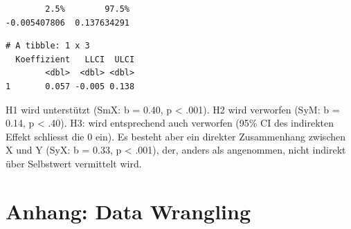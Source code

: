 \documentclass[
  letterpaper,
  DIV=11,
  numbers=noendperiod]{scrreprt}
\newenvironment{Shaded}{\begin{snugshade}}{\end{snugshade}}
\newcommand{\AttributeTok}[1]{\textcolor[rgb]{0.40,0.45,0.13}{#1}}
\newcommand{\CommentTok}[1]{\textcolor[rgb]{0.37,0.37,0.37}{#1}}
\newcommand{\ConstantTok}[1]{\textcolor[rgb]{0.56,0.35,0.01}{#1}}
\newcommand{\DecValTok}[1]{\textcolor[rgb]{0.68,0.00,0.00}{#1}}
\newcommand{\FloatTok}[1]{\textcolor[rgb]{0.68,0.00,0.00}{#1}}
\newcommand{\FunctionTok}[1]{\textcolor[rgb]{0.28,0.35,0.67}{#1}}
\newcommand{\NormalTok}[1]{\textcolor[rgb]{0.00,0.23,0.31}{#1}}
\newcommand{\OtherTok}[1]{\textcolor[rgb]{0.00,0.23,0.31}{#1}}
\newcommand{\SpecialCharTok}[1]{\textcolor[rgb]{0.37,0.37,0.37}{#1}}
\newcommand{\StringTok}[1]{\textcolor[rgb]{0.13,0.47,0.30}{#1}}
\begin{document}
\begin{tcolorbox}
\begin{verbatim}
        2.5%        97.5% 
-0.005407806  0.137634291 
\end{verbatim}

\begin{Shaded}
\end{Shaded}

\begin{verbatim}
# A tibble: 1 x 3
  Koeffizient   LLCI  ULCI
        <dbl>  <dbl> <dbl>
1       0.057 -0.005 0.138
\end{verbatim}

H1 wird unterstützt (SmX: b = 0.40, p \textless{} .001). H2 wird
verworfen (SyM: b = 0.14, p \textless{} .40). H3: wird entsprechend auch
verworfen (95\% CI des indirekten Effekt schliesst die 0 ein). Es
besteht aber ein direkter Zusammenhang zwischen X und Y (SyX: b = 0.33,
p \textless{} .001), der, anders als angenommen, nicht indirekt über
Selbstwert vermittelt wird.

\end{tcolorbox}


\chapter{Anhang: Data Wrangling}\label{anhang-data-wrangling}
\end{document}
